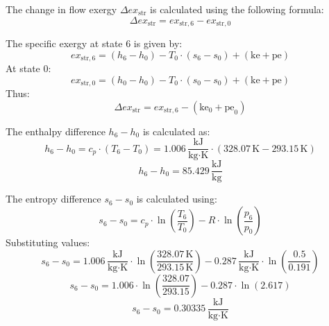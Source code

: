 The change in flow exergy \( \Delta ex_{\text{str}} \) is calculated using the following formula:  
\[
\Delta ex_{\text{str}} = ex_{\text{str},6} - ex_{\text{str},0}
\]  

The specific exergy at state 6 is given by:  
\[
ex_{\text{str},6} = (h_6 - h_0) - T_0 \cdot (s_6 - s_0) + (\text{ke} + \text{pe})
\]  
At state 0:  
\[
ex_{\text{str},0} = (h_0 - h_0) - T_0 \cdot (s_0 - s_0) + (\text{ke} + \text{pe})
\]  
Thus:  
\[
\Delta ex_{\text{str}} = ex_{\text{str},6} - (\text{ke}_0 + \text{pe}_0)
\]  

The enthalpy difference \( h_6 - h_0 \) is calculated as:  
\[
h_6 - h_0 = c_p \cdot (T_6 - T_0) = 1.006 \, \frac{\text{kJ}}{\text{kg·K}} \cdot (328.07 \, \text{K} - 293.15 \, \text{K})
\]  
\[
h_6 - h_0 = 85.429 \, \frac{\text{kJ}}{\text{kg}}
\]  

The entropy difference \( s_6 - s_0 \) is calculated using:  
\[
s_6 - s_0 = c_p \cdot \ln\left(\frac{T_6}{T_0}\right) - R \cdot \ln\left(\frac{p_6}{p_0}\right)
\]  
Substituting values:  
\[
s_6 - s_0 = 1.006 \, \frac{\text{kJ}}{\text{kg·K}} \cdot \ln\left(\frac{328.07 \, \text{K}}{293.15 \, \text{K}}\right) - 0.287 \, \frac{\text{kJ}}{\text{kg·K}} \cdot \ln\left(\frac{0.5}{0.191}\right)
\]  
\[
s_6 - s_0 = 1.006 \cdot \ln\left(\frac{328.07}{293.15}\right) - 0.287 \cdot \ln\left(2.617\right)
\]  
\[
s_6 - s_0 = 0.30335 \, \frac{\text{kJ}}{\text{kg·K}}
\]